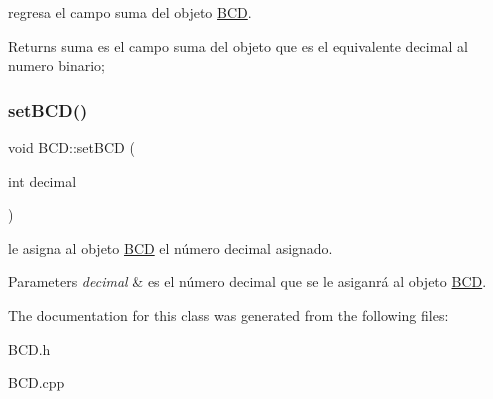 regresa el campo suma del objeto \hyperlink{classBCD}{B\+CD}. 

\begin{DoxyReturn}{Returns}
suma es el campo suma del objeto que es el equivalente decimal al numero binario; 
\end{DoxyReturn}
\mbox{\label{classBCD_ae6596927da1233e50f527192f7171269}} 
\subsubsection{\texorpdfstring{set\+B\+C\+D()}{setBCD()}}
{\footnotesize\ttfamily void B\+C\+D\+::set\+B\+CD (\begin{DoxyParamCaption}\item[{int}]{decimal }\end{DoxyParamCaption})}



le asigna al objeto \hyperlink{classBCD}{B\+CD} el número decimal asignado. 


\begin{DoxyParams}{Parameters}
{\em decimal} & es el número decimal que se le asiganrá al objeto \hyperlink{classBCD}{B\+CD}. \\
\hline
\end{DoxyParams}


The documentation for this class was generated from the following files\+:\begin{DoxyCompactItemize}
\item 
B\+C\+D.\+h\item 
B\+C\+D.\+cpp\end{DoxyCompactItemize}
